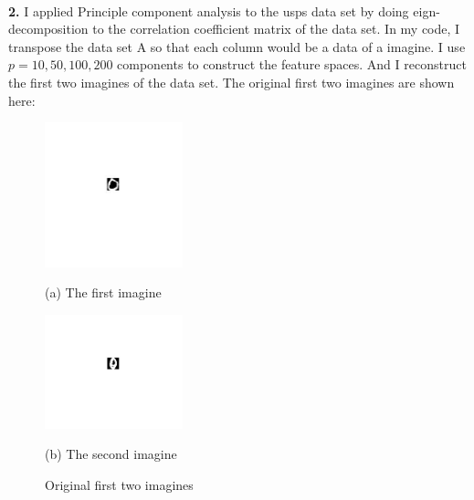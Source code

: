 \documentclass[letterpaper,12pt]{article}
\begin{document}
\quad \\
\textbf{2.} I applied Principle component analysis to the usps data set by doing eign-decomposition to the correlation coefficient matrix of the data set. In my code, I transpose the data set A so that each column would be a data of a imagine. I use $p = 10, 50, 100, 200$ components to construct the feature spaces. And I reconstruct the first two imagines of the data set. The original first two imagines are shown here:
\begin{center}
\begin{figure}[h]
\begin{minipage}{0.48\linewidth}
  \centerline{\includegraphics[width=4.0cm]{pca1.jpg}}
  \centerline{(a) The first imagine}
\end{minipage}
\hfill
\begin{minipage}{.48\linewidth}
  \centerline{\includegraphics[width=4.0cm]{pca2.jpg}}
  \centerline{(b) The second imagine}
\end{minipage}
\caption{Original first two imagines}
\label{fig:res}
\end{figure}
\end{center}
\end{document}
